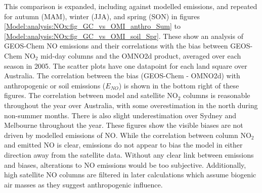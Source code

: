     
    
    This comparison is expanded, including against modelled emissions, and repeated for autumn (MAM), winter (JJA), and spring (SON) in figures \ref{Model:analysis:NOx:fig_GC_vs_OMI_anthro_Sum} to \ref{Model:analysis:NOx:fig_GC_vs_OMI_soil_Spr}.
    These show an analysis of GEOS-Chem NO emissions and their correlations with the bias between GEOS-Chem NO$_2$ mid-day columns and the OMNO2d product, averaged over each season in 2005.
    The scatter plots have one datapoint for each land square over Australia.
    The correlation between the bias (GEOS-Chem - OMNO2d) with anthropogenic or soil emissions ($E_{NO}$) is shown in the bottom right of these figures.    
    The correlation between model and satellite NO$_2$ columns is reasonable throughout the year over Australia, with some overestimation in the north during non-summer months.
    There is also slight underestimation over Sydney and Melbourne throughout the year.
    These figures show the visible biases are not driven by modelled emissions of NO.
    While the correlation between column NO$_2$ and emitted NO is clear, emissions do not appear to bias the model in either direction away from the satellite data.
    Without any clear link between emissions and biases, alterations to NO emissions would be too subjective.
    Additionally, high satellite NO columns are filtered in later calculations which assume biogenic air masses as they suggest anthropogenic influence.
    
    
